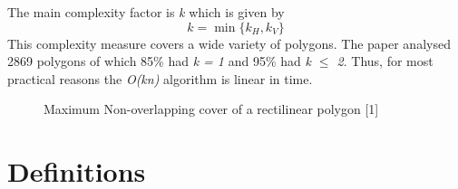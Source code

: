 The main complexity factor is \emph{k} which is given by
\begin{displaymath}
	 k = \min \{k_H, k_V\}
\end{displaymath}
This complexity measure covers a wide variety of polygons. The paper analysed 2869 polygons of which 85\% had \emph{k = 1} and 95\% had \emph{k $\leq$ 2}. Thus, for most practical reasons the \emph{O(kn)} algorithm is linear in time.
\\
\begin{figure}[h]
	\centering
	\caption{ Maximum Non-overlapping cover of a rectilinear polygon [1]}
	\label{fig:max cover}
\end{figure}

\chapter{Definitions}
\label{Definitions}

